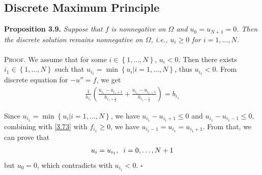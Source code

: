 \documentclass[a4paper]{article}
\numberwithin{equation}{section}
\begin{document}
\subsection{Discrete Maximum Principle}
\textbf{Proposition 3.9.} \textit{Suppose that $f$ is nonnegative on $\Omega$ and $u_0=u_{N+1}=0$. Then the discrete solution remains nonnegative on $\Omega$, i.e., $u_i\ge 0$ for $i=1,\ldots,N$.}\\
\\
\textsc{Proof.} We assume that for some $i \in \left\{ {1, \ldots ,N} \right\}$, $u_i<0$. Then there exists $i_1 \in \left\{ {1, \ldots ,N} \right\}$ such that ${u_{{i_1}}} = \min \left\{ {{u_i}|i = 1, \ldots ,N} \right\}$, thus $u_{i_1}<0$. From discrete equation for $-u''=f$, we get
\begin{align}
\label{3.73}
\frac{1}{{{h_{{i_1}}}}}\left( {\frac{{{u_{{i_1}}} - {u_{{i_1} + 1}}}}{{{h_{{i_1} + \frac{1}{2}}}}} + \frac{{{u_{{i_1}}} - {u_{{i_1} - 1}}}}{{{h_{{i_1} - \frac{1}{2}}}}}} \right) = {b_{{i_1}}}
\end{align}

Since ${u_{{i_1}}} = \min \left\{ {{u_i}|i = 1, \ldots ,N} \right\}$, we have ${u_{{i_1}}} - {u_{{i_1} + 1}} \le 0$ and ${u_{{i_1}}} - {u_{{i_1} - 1}} \le 0$, combining with \eqref{3.73} with $f_{i_1}\ge 0$, we have ${u_{{i_1} - 1}} = {u_{{i_1}}} = {u_{{i_1} + 1}}$. From that, we can prove that
\begin{align}
{u_i} = {u_{{i_1}}},\hspace{0.2cm} i = 0, \ldots ,N + 1
\end{align}
but $u_0=0$, which contradicts with $u_{i_1}<0$. \hfill $\square$
\end{document}
